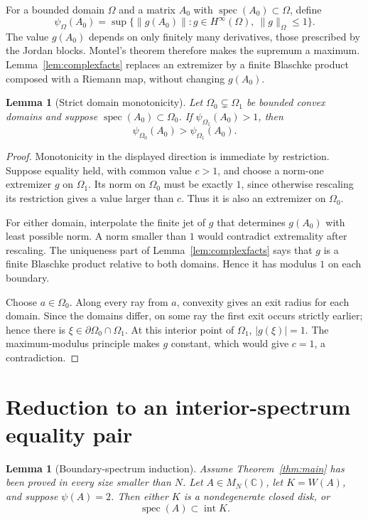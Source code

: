 \documentclass[11pt]{article}
\newtheorem{lemma}[theorem]{Lemma}
\theoremstyle{definition}
\theoremstyle{remark}
\newcommand{\C}{\mathbb C}
\newcommand{\spec}{\operatorname{spec}}
\newcommand{\Int}{\operatorname{int}}
\begin{document}
For a bounded domain \(\Omega\) and a matrix \(A_0\) with
\(\spec(A_0)\subset\Omega\), define
\[
 \psi_\Omega(A_0)=\sup\{\|g(A_0)\|:g\in H^\infty(\Omega),\
                         \|g\|_\Omega\leq1\}.
\]
The value \(g(A_0)\) depends on only finitely many derivatives, those prescribed
by the Jordan blocks.  Montel's theorem therefore makes the supremum a
maximum.  Lemma~\ref{lem:complexfacts} replaces an extremizer by a finite
Blaschke product composed with a Riemann map, without changing \(g(A_0)\).

\begin{lemma}[Strict domain monotonicity]\label{lem:strict-domain}
Let \(\Omega_0\subsetneq\Omega_1\) be bounded convex domains and suppose
\(\spec(A_0)\subset\Omega_0\).  If \(\psi_{\Omega_1}(A_0)>1\), then
\[
 \psi_{\Omega_0}(A_0)>\psi_{\Omega_1}(A_0).
\]
\end{lemma}

\begin{proof}
Monotonicity in the displayed direction is immediate by restriction.  Suppose
equality held, with common value \(c>1\), and choose a norm-one extremizer \(g\)
on \(\Omega_1\).  Its norm on \(\Omega_0\) must be exactly \(1\), since otherwise
rescaling its restriction gives a value larger than \(c\).  Thus it is also an
extremizer on \(\Omega_0\).

For either domain, interpolate the finite jet of \(g\) that determines \(g(A_0)\)
with least possible norm.  A norm smaller than \(1\) would contradict
extremality after rescaling.  The uniqueness part of
Lemma~\ref{lem:complexfacts} says that \(g\) is a finite Blaschke product
relative to both domains.  Hence it has modulus \(1\) on each boundary.

Choose \(a\in\Omega_0\).  Along every ray from \(a\), convexity gives an exit
radius for each domain.  Since the domains differ, on some ray the first exit
occurs strictly earlier; hence there is
\(\xi\in\partial\Omega_0\cap\Omega_1\).  At this interior point of \(\Omega_1\),
\(|g(\xi)|=1\).  The maximum-modulus principle makes \(g\) constant, which
would give \(c=1\), a contradiction.
\end{proof}

\section{Reduction to an interior-spectrum equality pair}

\begin{lemma}[Boundary-spectrum induction]\label{lem:induction}
Assume Theorem~\ref{thm:main} has been proved in every size smaller than \(N\).
Let \(A\in M_N(\C)\), let \(K=W(A)\), and suppose \(\psi(A)=2\).  Then either
\(K\) is a nondegenerate closed disk, or
\[
 \spec(A)\subset\Int K.                               \tag{4.1}
\]
\end{lemma}
\end{document}
